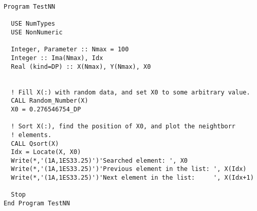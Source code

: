 \begin{verbatim}
Program TestNN

  USE NumTypes
  USE NonNumeric

  Integer, Parameter :: Nmax = 100
  Integer :: Ima(Nmax), Idx
  Real (kind=DP) :: X(Nmax), Y(Nmax), X0


  ! Fill X(:) with random data, and set X0 to some arbitrary value. 
  CALL Random_Number(X)
  X0 = 0.276546754_DP

  ! Sort X(:), find the position of X0, and plot the neightborr
  ! elements. 
  CALL Qsort(X)
  Idx = Locate(X, X0)
  Write(*,'(1A,1ES33.25)')'Searched element: ', X0
  Write(*,'(1A,1ES33.25)')'Previous element in the list: ', X(Idx)
  Write(*,'(1A,1ES33.25)')'Next element in the list:     ', X(Idx+1)

  Stop
End Program TestNN
\end{verbatim}

